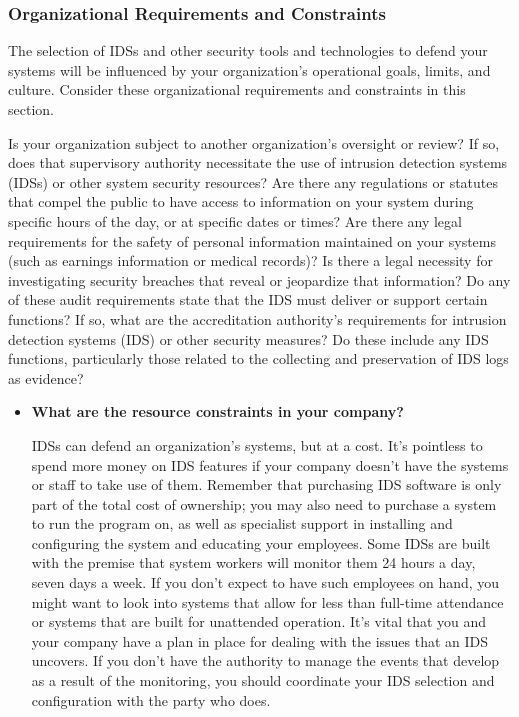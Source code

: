 \documentclass[12pt]{article}
\begin{document}
    \subsubsection{Organizational Requirements and Constraints}
    \par The selection of IDSs and other security tools and technologies to defend your systems will be influenced by your organization's operational goals, limits, and culture. Consider these organizational requirements and constraints in this section.
    \par Is your organization subject to another organization's oversight or review? If so, does that supervisory authority necessitate the use of intrusion detection systems (IDSs) or other system security resources? Are there any regulations or statutes that compel the public to have access to information on your system during specific hours of the day, or at specific dates or times? Are there any legal requirements for the safety of personal information maintained on your systems (such as earnings information or medical records)? Is there a legal necessity for investigating security breaches that reveal or jeopardize that information? Do any of these audit requirements state that the IDS must deliver or support certain functions? If so, what are the accreditation authority's requirements for intrusion detection systems (IDS) or other security measures? Do these include any IDS functions, particularly those related to the collecting and preservation of IDS logs as evidence?
    \begin{itemize}
        \item \textbf{What are the resource constraints in your company?}
        \par IDSs can defend an organization's systems, but at a cost. It's pointless to spend more money on IDS features if your company doesn't have the systems or staff to take use of them. Remember that purchasing IDS software is only part of the total cost of ownership; you may also need to purchase a system to run the program on, as well as specialist support in installing and configuring the system and educating your employees. Some IDSs are built with the premise that system workers will monitor them 24 hours a day, seven days a week. If you don't expect to have such employees on hand, you might want to look into systems that allow for less than full-time attendance or systems that are built for unattended operation. It's vital that you and your company have a plan in place for dealing with the issues that an IDS uncovers. If you don't have the authority to manage the events that develop as a result of the monitoring, you should coordinate your IDS selection and configuration with the party who does.
        
    \end{itemize}
    
\end{document}
